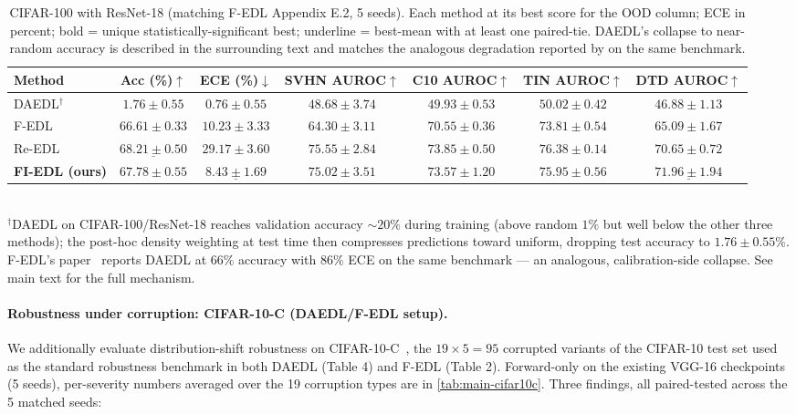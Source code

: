 \documentclass[review,5p,times]{elsarticle}
\begin{document}
\begin{table}[t]
  \centering
  \caption{CIFAR-100 with ResNet-18 (matching F-EDL Appendix E.2,
    5 seeds). Each method at its best score for the OOD column; ECE in
    percent; bold = unique statistically-significant best; underline =
    best-mean with at least one paired-tie. DAEDL's collapse to
    near-random accuracy is described in the surrounding text and
    matches the analogous degradation reported by \citet{yoon2025fedl}
    on the same benchmark.}
  \label{tab:main-cifar100}
  \small
  \begin{tabular}{lcccccc}
    \toprule
    Method & Acc (\%)$\uparrow$ & ECE (\%)$\downarrow$ & SVHN AUROC$\uparrow$
      & C10 AUROC$\uparrow$ & TIN AUROC$\uparrow$ & DTD AUROC$\uparrow$ \\
    \midrule
    DAEDL$^{\dagger}$  & $1.76 \pm 0.55$ & $0.76 \pm 0.55$ &
      $48.68 \pm 3.74$ & $49.93 \pm 0.53$ & $50.02 \pm 0.42$ & $46.88 \pm 1.13$ \\
    F-EDL   & $66.61 \pm 0.33$ & $10.23 \pm 3.33$ &
      $64.30 \pm 3.11$ & $70.55 \pm 0.36$ & $73.81 \pm 0.54$ & $65.09 \pm 1.67$ \\
    Re-EDL  & $\underline{68.21 \pm 0.50}$ & $29.17 \pm 3.60$ &
      \underline{$75.55 \pm 2.84$} & \underline{$73.85 \pm 0.50$} &
      \underline{$76.38 \pm 0.14$} & $70.65 \pm 0.72$ \\
    \textbf{FI-EDL (ours)} & $67.78 \pm 0.55$ & $\underline{8.43 \pm 1.69}$ &
      $75.02 \pm 3.51$ & $73.57 \pm 1.20$ & $75.95 \pm 0.56$ &
      $\underline{71.96 \pm 1.94}$ \\
    \bottomrule
  \end{tabular}
  \\ {\footnotesize $^{\dagger}$DAEDL on CIFAR-100/ResNet-18 reaches
   validation accuracy $\sim\!20\%$ during training (above random $1\%$
   but well below the other three methods); the post-hoc density
   weighting at test time then compresses predictions toward uniform,
   dropping test accuracy to $1.76\!\pm\!0.55\%$. F-EDL's
   paper~\citep{yoon2025fedl} reports DAEDL at $66\%$ accuracy with
   $86\%$ ECE on the same benchmark — an analogous, calibration-side
   collapse. See main text for the full mechanism.}
\end{table}

\paragraph{Robustness under corruption: CIFAR-10-C
(DAEDL/F-EDL setup).}
We additionally evaluate distribution-shift robustness on
CIFAR-10-C~\citep{hendrycks2019benchmarking}, the
$19\!\times\!5\!=\!95$ corrupted variants of the CIFAR-10 test set used
as the standard robustness benchmark in both DAEDL (Table 4) and
F-EDL (Table 2). Forward-only on the existing VGG-16 checkpoints
(5 seeds), per-severity numbers averaged over the 19 corruption types
are in \autoref{tab:main-cifar10c}. Three findings, all paired-tested
across the 5 matched seeds:
\end{document}

